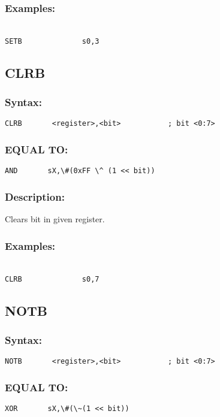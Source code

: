 {        \subsubsection{Examples:}
        {
            ~\\
            \usecodefont
            \verb'SETB              s0,3'\\
        }

    \subsection{CLRB}
        \subsubsection{Syntax:}
            \verb'CLRB       <register>,<bit>           ; bit <0:7>'

        \subsubsection{EQUAL TO:}
            \verb'AND       sX,\#(0xFF \^ (1 << bit))'

        \subsubsection{Description:}
            Clears bit in given register.

        \subsubsection{Examples:}
        {
            ~\\
            \usecodefont
            \verb'CLRB              s0,7'\\
        }

    \subsection{NOTB}
        \subsubsection{Syntax:}
            \verb'NOTB       <register>,<bit>           ; bit <0:7>'

        \subsubsection{EQUAL TO:}
            \verb'XOR       sX,\#(\~(1 << bit))'

}
